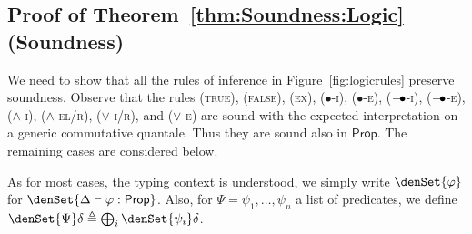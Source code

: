 \documentclass[a4paper,UKenglish,cleveref, autoref, thm-restate]{lipics-v2021}
\newcommand{\ts}{\vdash}
\newcommand{\hastype}[3]{#1\ts #2 : #3}
\newcommand{\Prop}{\mathsf{Prop}}
\newcommand{\ltensor}{*}
\renewcommand{\ltensor}{\bullet}
\newcommand{\lexp}{\mathbin{{-}\kern-.2em\raisebox{0ex}{$*$}}}
\renewcommand{\lexp}{\mathbin{{-}\kern-.2em\raisebox{0ex}{$\bullet$}}}
\newcommand{\defeq}{\triangleq}
\begin{document}
\subsection*{Proof of Theorem~\ref{thm:Soundness:Logic} (Soundness)}
We need to show that all the rules of inference in Figure~\ref{fig:logicrules} preserve soundness.
Observe that the rules (\textsc{true}), (\textsc{false}), (\textsc{ex}),
(\textsc{$\ltensor$-i}), (\textsc{$\ltensor$-e}), (\textsc{$\lexp$-i}), 
(\textsc{$\lexp$-e}), (\textsc{$\wedge$-i}), (\textsc{$\wedge$-el/r}), 
(\textsc{$\vee$-i/r}), and (\textsc{$\vee$-e}) are sound with the expected interpretation on a generic commutative quantale. Thus they are sound also in $\Prop$.
The remaining cases are considered below. 

As for most cases, the typing context is understood, we simply write
$\denSet{\varphi}$ for $\denSet{\hastype{\Delta}{\varphi}{\Prop}}$. Also, for $\Psi = \psi_1, \dots, \psi_n$ a list of predicates, we define 
$\denSet{\Psi}\delta \defeq \bigoplus_i\denSet{\psi_i}\delta$.
\end{document}
